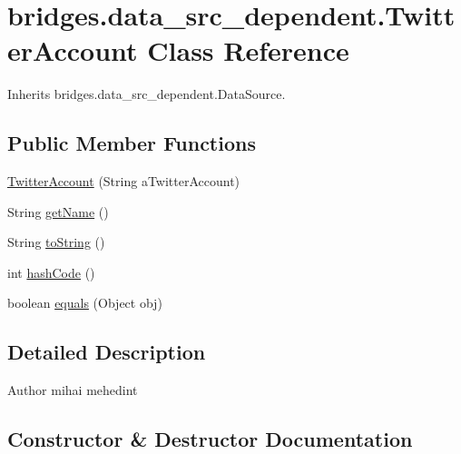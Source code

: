 \hypertarget{classbridges_1_1data__src__dependent_1_1_twitter_account}{}\section{bridges.\+data\+\_\+src\+\_\+dependent.\+Twitter\+Account Class Reference}
\label{classbridges_1_1data__src__dependent_1_1_twitter_account}


Inherits bridges.\+data\+\_\+src\+\_\+dependent.\+Data\+Source.

\subsection*{Public Member Functions}
\begin{DoxyCompactItemize}
\item 
\mbox{\hyperlink{classbridges_1_1data__src__dependent_1_1_twitter_account_a725febd1fcbbee710fd638d6b4a9db62}{Twitter\+Account}} (String a\+Twitter\+Account)
\item 
String \mbox{\hyperlink{classbridges_1_1data__src__dependent_1_1_twitter_account_a92c536bd6a65c51d84a77d772775e20c}{get\+Name}} ()
\item 
String \mbox{\hyperlink{classbridges_1_1data__src__dependent_1_1_twitter_account_af4dd5dfe1a1556fa57f917fb24d8d6f2}{to\+String}} ()
\item 
int \mbox{\hyperlink{classbridges_1_1data__src__dependent_1_1_twitter_account_a2f89f6f336b1bd39f0cf3aa444c76885}{hash\+Code}} ()
\item 
boolean \mbox{\hyperlink{classbridges_1_1data__src__dependent_1_1_twitter_account_a2bddc8fe99b9096fe90968d805fa91e1}{equals}} (Object obj)
\end{DoxyCompactItemize}


\subsection{Detailed Description}
\begin{DoxyAuthor}{Author}
mihai mehedint 
\end{DoxyAuthor}


\subsection{Constructor \& Destructor Documentation}
\mbox{\label{classbridges_1_1data__src__dependent_1_1_twitter_account_a725febd1fcbbee710fd638d6b4a9db62}} 
